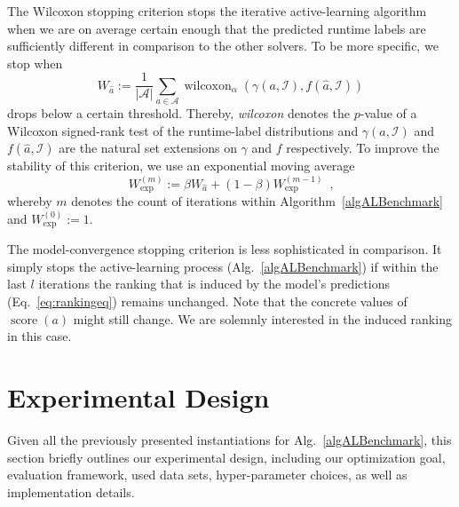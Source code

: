 \documentclass[runningheads]{llncs}
\begin{document}
The Wilcoxon stopping criterion stops the iterative active-learning algorithm when we are on average certain enough that the predicted runtime labels are sufficiently different in comparison to the other solvers.
To be more specific, we stop when
\begin{equation}
  W_{\hat{a}} := \frac{1}{\left\lvert \mathcal{A} \right\rvert} \sum_{a \in \mathcal{A}} \operatorname{wilcoxon}_{\alpha}\!\left(\gamma\!\left(a, \mathcal{I}\right), f\!\left(\hat{a}, \mathcal{I}\right) \right)
\end{equation}
drops below a certain threshold.
Thereby, \emph{wilcoxon} denotes the $p$-value of a Wilcoxon signed-rank test of the runtime-label distributions and $\gamma\!\left(a, \mathcal{I}\right)$ and $f\!\left(\hat{a}, \mathcal{I}\right)$ are the natural set extensions on $\gamma$ and $f$ respectively.
To improve the stability of this criterion, we use an exponential moving average
\begin{equation}
  W_{\exp}^{\left(m\right)} := \beta W_{\hat{a}} + \left(1 - \beta\right) W_{\exp}^{\left(m - 1\right)} \enspace \textrm{,}
\end{equation}
whereby $m$ denotes the count of iterations within Algorithm~\ref{algALBenchmark} and $W_{\exp}^{\left(0\right)} := 1$.

The model-convergence stopping criterion is less sophisticated in comparison.
It simply stops the active-learning process (Alg.~\ref{algALBenchmark}) if within the last $l$ iterations the ranking that is induced by the model's predictions (Eq.~\ref{eq:rankingeq}) remains unchanged.
Note that the concrete values of $\operatorname{score}\!\left(a\right)$ might still change.
We are solemnly interested in the induced ranking in this case.


\section{Experimental Design}
Given all the previously presented instantiations for Alg.~\ref{algALBenchmark}, this section briefly outlines our experimental design, including our optimization goal, evaluation framework, used data sets, hyper-parameter choices, as well as implementation details.
\end{document}
